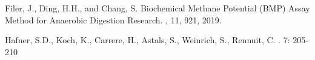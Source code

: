 \documentclass{article}
\begin{document}
  
\begin{thebibliography}{1}

Filer, J., Ding, H.H., and Chang, S.
\newblock Biochemical Methane Potential (BMP) Assay Method for Anaerobic Digestion Research.
, 11, 921, 2019.

Hafner, S.D., Koch, K., Carrere, H., Astals, S., Weinrich, S., Rennuit, C.
  . 
   7: 205-210

\end{thebibliography}
\end{document}
